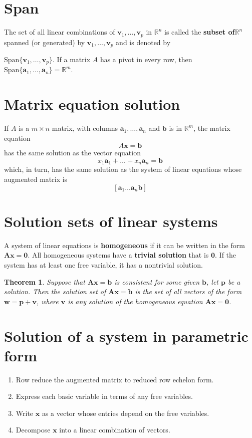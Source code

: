 \documentclass[12pt, oneside]{book}
\newtheorem{theorem}{Theorem}
\begin{document}
\section{Span}
The set of all linear combinations of \(\mathbf{v}_1, \ldots, \mathbf{v}_p\) in
\(\mathbb{R}^n\) is called the \textbf{subset of}\(\mathbb{R}^n\) spanned (or
generated) by \(\mathbf{v}_1, \ldots, \mathbf{v}_p\) and is denoted by

\(\mathrm{Span}\{\mathbf{v}_1, \ldots, \mathbf{v}_p\}\). If a matrix \(A\) has a
pivot in every row, then \(\mathrm{Span} \{\mathbf{a}_1, \ldots, \mathbf{a}_n\}
= \mathbb{R}^m\).

\section{Matrix equation solution}
If \(A\) is a \(m \times n\) matrix, with columns \(\mathbf{a}_1, \ldots,
\mathbf{a}_n\) and \(\mathbf{b}\) is in \(\mathbb{R}^m\),
the matrix equation
\[ A\mathbf{x} = \mathbf{b} \]
has the same solution as the vector equation
\[ x_1\mathbf{a}_1 + \ldots + x_n\mathbf{a}_n = \mathbf{b} \]
which, in turn,
has the same solution as the system of linear equations whose
augmented matrix is
\[ [ \mathbf{a}_1 \ldots \mathbf{a}_n \mathbf{b} ] \]

\section{Solution sets of linear systems}
A system of linear equations is \textbf{homogeneous}
if it can be written in the form \( \mathbf{A x} = \mathbf{0} \).
All homogeneous systems have a \textbf{trivial solution} that is \(\mathbf{0}\).
If the system has at least one free variable, it has a nontrivial solution.

\begin{theorem}
  Suppose that \( \mathbf{Ax} = \mathbf{b} \) is consistent for some given
  \(\mathbf{b}\), let \(\mathbf {p}\) be a solution. Then the solution set of
  \( \mathbf{Ax} = \mathbf{b} \) is the set of all vectors of the form
  \( \mathbf{w} = \mathbf{p} + \mathbf{v} \), where \( \mathbf{v} \) is any
  solution of the homogeneous equation \( \mathbf{Ax} = \mathbf{0} \).
\end{theorem}

\section{Solution of a system in parametric form}
\begin{enumerate}
\item{Row reduce the augmented matrix to reduced row echelon form.}
\item{Express each basic variable in terms of any free variables.}
\item{Write \(\mathbf{x}\) as a vector whose entries depend on the free
variables.}
\item{Decompose \(\mathbf{x}\) into a linear combination of vectors.}
\end{enumerate}
\end{document}
